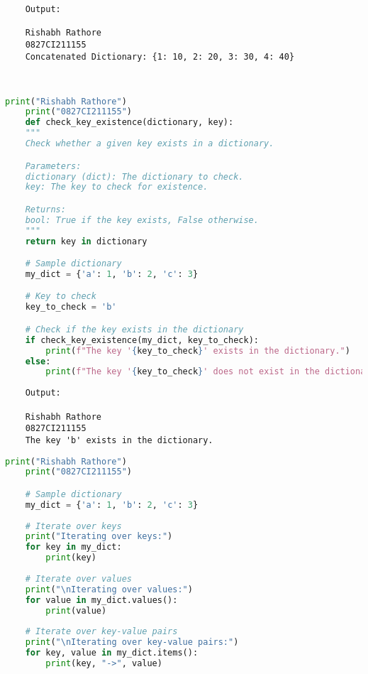 \documentclass{report}
\begin{document}
\begin{verbatim}
	Output:

	Rishabh Rathore
	0827CI211155
	Concatenated Dictionary: {1: 10, 2: 20, 3: 30, 4: 40}

	

\end{verbatim}


\newpage


\sol 
\begin{lstlisting}[language=Python]
	print("Rishabh Rathore")
	print("0827CI211155")
	def check_key_existence(dictionary, key):
    """
    Check whether a given key exists in a dictionary.

    Parameters:
    dictionary (dict): The dictionary to check.
    key: The key to check for existence.

    Returns:
    bool: True if the key exists, False otherwise.
    """
    return key in dictionary

	# Sample dictionary
	my_dict = {'a': 1, 'b': 2, 'c': 3}

	# Key to check
	key_to_check = 'b'

	# Check if the key exists in the dictionary
	if check_key_existence(my_dict, key_to_check):
		print(f"The key '{key_to_check}' exists in the dictionary.")
	else:
		print(f"The key '{key_to_check}' does not exist in the dictionary.")
\end{lstlisting}

\begin{verbatim}
	Output:

	Rishabh Rathore
	0827CI211155
	The key 'b' exists in the dictionary.	

\end{verbatim}



\newpage


\sol 
\begin{lstlisting}[language=Python]
	print("Rishabh Rathore")
	print("0827CI211155")

	# Sample dictionary
	my_dict = {'a': 1, 'b': 2, 'c': 3}
	
	# Iterate over keys
	print("Iterating over keys:")
	for key in my_dict:
		print(key)
	
	# Iterate over values
	print("\nIterating over values:")
	for value in my_dict.values():
		print(value)
	
	# Iterate over key-value pairs
	print("\nIterating over key-value pairs:")
	for key, value in my_dict.items():
		print(key, "->", value)
	

\end{lstlisting}
\end{document}
